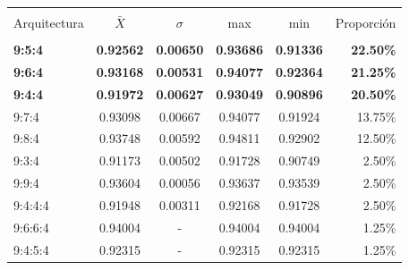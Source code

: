 \documentclass[spanish,a4paper,12pt,twoside]{report}
\begin{document}
\begin{center}
   \label{table}
  \begin{tabular}{l c c c c r}
    \hline \\ [-2ex]
    Arquitectura & $\bar{X}$ & $\sigma$ & max & min & Proporción \\ [0.5ex]
    \hline \\ [-1ex]
    \textbf{9:5:4} & \textbf{0.92562} & \textbf{0.00650} & \textbf{0.93686} & \textbf{0.91336} & \textbf{22.50\%} \\
    \textbf{9:6:4} & \textbf{0.93168} & \textbf{0.00531} & \textbf{0.94077} & \textbf{0.92364} & \textbf{21.25\%} \\
    \textbf{9:4:4} & \textbf{0.91972} & \textbf{0.00627} & \textbf{0.93049} & \textbf{0.90896} & \textbf{20.50\%} \\
    9:7:4 & 0.93098 & 0.00667 & 0.94077 & 0.91924 & 13.75\% \\
    9:8:4 & 0.93748 & 0.00592 & 0.94811 & 0.92902 & 12.50\% \\
    9:3:4 & 0.91173 & 0.00502 & 0.91728 & 0.90749 & 2.50\% \\
    9:9:4 & 0.93604 & 0.00056 & 0.93637 & 0.93539 & 2.50\% \\
    9:4:4:4 & 0.91948 & 0.00311 & 0.92168 & 0.91728 & 2.50\% \\
    9:6:6:4 & 0.94004 & - & 0.94004 & 0.94004 & 1.25\% \\
    9:4:5:4 & 0.92315 & - & 0.92315 & 0.92315 & 1.25\% \\[1ex]
    \hline
  \end{tabular}
\end{center} \par
  
  \newpage\cleardoublepage
  
\end{document}
